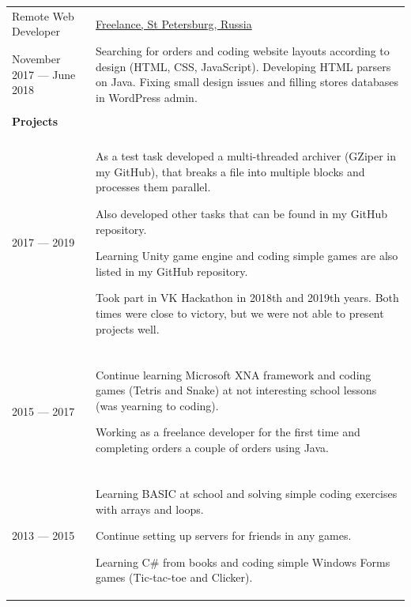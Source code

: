 \documentclass[12pt]{article}
\begin{document}
\begin{tabularx}{500pt}{eX}
        Remote Web Developer & \underline{Freelance, St Petersburg, Russia} \\

        November 2017 --- June 2018

        & Searching for orders and coding website layouts according to design (HTML, CSS, JavaScript).
        Developing HTML parsers on Java.
        Fixing small design issues and filling stores databases in WordPress admin.

        \\

        &\\

        \textbf{Projects} &

        \\

        &\\

        2017 --- 2019 & As a test task developed a multi-threaded archiver (GZiper in my GitHub), that breaks a file into multiple blocks and processes them parallel.

        Also developed other tasks that can be found in my GitHub repository.

        Learning Unity game engine and coding simple games are also listed in my GitHub repository.

        Took part in VK Hackathon in 2018th and 2019th years.
        Both times were close to victory, but we were not able to present projects well.

        \\

        &\\

        2015 --- 2017 & Continue learning Microsoft XNA framework and coding games (Tetris and Snake) at not interesting school lessons (was yearning to coding).

        Working as a freelance developer for the first time and completing orders a couple of orders using Java.

        \\

        &\\

        2013 --- 2015 & Learning BASIC at school and solving simple coding exercises with arrays and loops.

        Continue setting up servers for friends in any games.

        Learning C\# from books and coding simple Windows Forms games (Tic-tac-toe and Clicker).


\end{tabularx}
\end{document}
